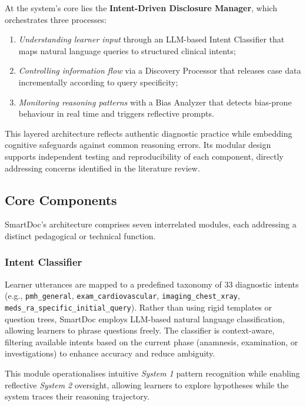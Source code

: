 At the system’s core lies the \textbf{Intent-Driven Disclosure Manager}, which
orchestrates three processes:

\begin{enumerate}
  \item \textit{Understanding learner input} through an LLM-based Intent
  Classifier that maps natural language queries to structured clinical intents;
  \item \textit{Controlling information flow} via a Discovery Processor that
  releases case data incrementally according to query specificity;
  \item \textit{Monitoring reasoning patterns} with a Bias Analyzer that detects
  bias-prone behaviour in real time and triggers reflective prompts.
\end{enumerate}

This layered architecture reflects authentic diagnostic practice while embedding
cognitive safeguards against common reasoning errors.
Its modular design supports independent testing and reproducibility of each
component, directly addressing concerns identified in the literature review.

\subsection{Core Components}

SmartDoc’s architecture comprises seven interrelated modules, each addressing a
distinct pedagogical or technical function.

\subsubsection{Intent Classifier}

Learner utterances are mapped to a predefined taxonomy of 33 diagnostic intents
(e.g., \texttt{pmh\_general}, \texttt{exam\_cardiovascular},
\texttt{imaging\_chest\_xray}, \texttt{meds\_ra\_specific\_initial\_query}).
Rather than using rigid templates or question trees, SmartDoc employs
LLM-based natural language classification, allowing learners to phrase questions
freely.  
The classifier is context-aware, filtering available intents based on the current
phase (anamnesis, examination, or investigations) to enhance accuracy and reduce
ambiguity.

This module operationalises intuitive \textit{System 1} pattern recognition
while enabling reflective \textit{System 2} oversight, allowing learners to
explore hypotheses while the system traces their reasoning trajectory.

